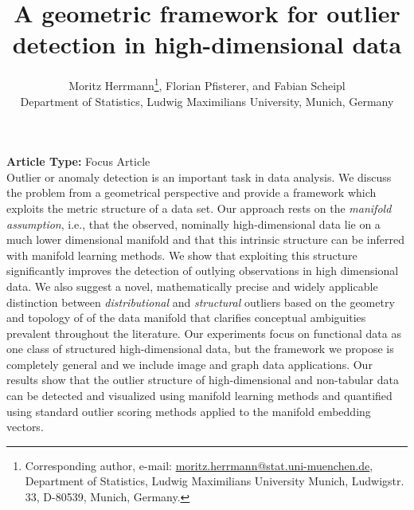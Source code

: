 \documentclass[
  10pt]{article}
\author{}
\date{\vspace{-2.5em}}
\renewenvironment{abstract}
  {{\bfseries\noindent{\abstractname}\par\nobreak}\footnotesize}
  {\bigskip}
\begin{document}
\title{A geometric framework for outlier detection in high-dimensional data}


\def\correspondingauthor{\footnote{Corresponding author, e-mail: \href{mailto:moritz.herrmann@stat.uni-muenchen.de}{moritz.herrmann@stat.uni-muenchen.de}, Department of Statistics, Ludwig Maximilians University Munich, Ludwigstr. 33, D-80539, Munich, Germany.}}
\author{Moritz Herrmann\correspondingauthor, Florian Pfisterer, and Fabian Scheipl \\
Department of Statistics, Ludwig Maximilians University, Munich, Germany}


\vspace{-1em}
  \date{}
\begingroup
\let\center\flushleft
\let\endcenter\endflushleft
\maketitle
\endgroup
{}

\textbf{Article Type:} Focus Article\\

\begin{abstract}
Outlier or anomaly detection is an important task in data analysis. We discuss the problem from a geometrical perspective and provide a framework which exploits the metric structure of a data set. Our approach rests on the \textit{manifold assumption}, i.e., that the observed, nominally high-dimensional data lie on a much lower dimensional manifold and that this intrinsic structure can be inferred with manifold learning methods. We show that exploiting this structure significantly improves the detection of outlying observations in high dimensional data. We also suggest a novel, mathematically precise and widely applicable distinction between \textit{distributional} and \textit{structural} outliers based on the geometry and topology of of the data manifold that clarifies conceptual ambiguities prevalent throughout the literature.
Our experiments focus on functional data as one class of structured high-dimensional data, but the framework we propose is completely general and we include image and graph data applications. Our results show that the outlier structure of high-dimensional and non-tabular data can be detected and visualized using manifold learning methods and quantified using standard outlier scoring methods applied to the manifold embedding vectors.
\end{abstract}
\end{document}
